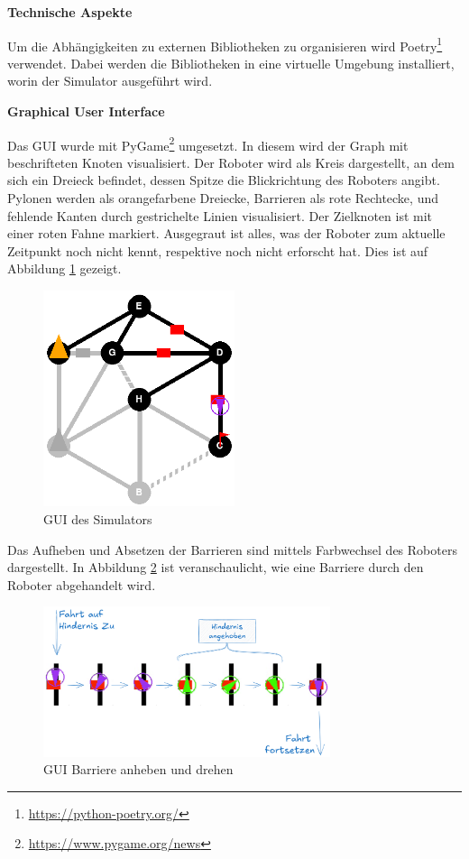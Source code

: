 \textbf{Technische Aspekte}\label{technical-aspect-simulator}

Um die Abhängigkeiten zu externen Bibliotheken zu organisieren wird Poetry\footnote{\url{https://python-poetry.org/}} verwendet. Dabei werden die Bibliotheken in eine virtuelle Umgebung installiert, worin der Simulator ausgeführt wird.

\textbf{Graphical User Interface}\label{gui}

Das GUI wurde mit PyGame\footnote{\url{https://www.pygame.org/news}} umgesetzt. In diesem wird der Graph mit beschrifteten Knoten visualisiert. Der Roboter wird als Kreis dargestellt, an dem sich ein Dreieck befindet, dessen Spitze die Blickrichtung des Roboters angibt. Pylonen werden als orangefarbene Dreiecke, Barrieren als rote Rechtecke, und fehlende Kanten durch gestrichelte Linien visualisiert. Der Zielknoten ist mit einer roten Fahne markiert.
Ausgegraut ist alles, was der Roboter zum aktuelle Zeitpunkt noch nicht kennt, respektive noch nicht erforscht hat. Dies ist auf Abbildung \ref{fig:sim-gui} gezeigt.

\begin{figure}[H]
\centering
\includegraphics[width=0.5\textwidth]{assets/informatik-prototyp/simulator/sim-ui.png}
\caption{GUI des Simulators}
\label{fig:sim-gui}
\end{figure}

Das Aufheben und Absetzen der Barrieren sind mittels Farbwechsel des Roboters dargestellt.
In Abbildung \ref{fig:sim-gui-barrier-flow} ist veranschaulicht, wie eine Barriere durch den Roboter abgehandelt wird.

\begin{figure}[H]
\centering
\includegraphics[width=0.75\textwidth]{assets/informatik-prototyp/simulator/sim-ui-barrier-flow.png}
\caption{GUI Barriere anheben und drehen}
\label{fig:sim-gui-barrier-flow}
\end{figure}



